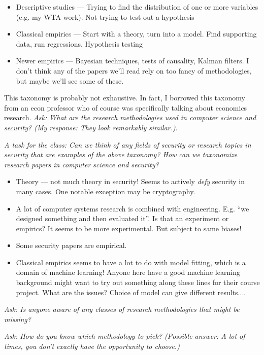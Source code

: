 \documentclass[11pt]{article}
\begin{document}
\begin{itemize}
\begin{itemize}
            \item Descriptive studies --- Trying to find the distribution of one or more variables (e.g. my WTA work). Not trying to test out a hypothesis
            \item Classical empirics --- Start with a theory, turn into a model. Find supporting data, run regressions. Hypothesis testing 
            \item Newer empirics --- Bayesian techniques, tests of causality, Kalman filters. I don't think any of the papers we'll read rely on too fancy of methodologies, but maybe we'll see some of these.
        \end{itemize}
\end{itemize}


This taxonomy is probably not exhaustive. In fact, I borrowed this taxonomy from an econ professor who of course was specifically talking about economics research. {\it Ask: What are the research methodologies used in computer science and security? (My response: They look remarkably similar.)}.

{\it A task for the class: Can we think of any fields of security or research topics in security that are examples of the above taxonomy? How can we taxonomize research papers in computer science and security?}

\begin{itemize}
    \item Theory --- not much theory in security! Seems to actively {\it defy} security in many cases. One notable exception may be cryptography.
    \item A lot of computer systems research is combined with engineering. E.g. ``we designed something and then evaluated it''. Is that an experiment or empirics? It seems to be more experimental. But subject to same biases!
    \item Some security papers are empirical. 
    \item Classical empirics seems to have a lot to do with model fitting, which is a domain of machine learning! Anyone here have a good machine learning background might want to try out something along these lines for their course project. What are the issues? Choice of model can give different results....
\end{itemize}


{\it Ask: Is anyone aware of any classes of research methodologies that might be missing? }

{\it Ask: How do you know which methodology to pick? (Possible answer: A lot of times, you don't exactly have the opportunity to choose.)}
\end{document}
